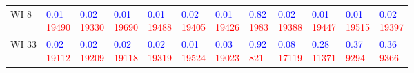 \begin{tabular}{llllllllllll}
WI 8   &  \makecell{\textcolor{blue}{0.01} \\ \textcolor{red}{19490}} &  \makecell{\textcolor{blue}{0.02} \\ \textcolor{red}{19330}} &  \makecell{\textcolor{blue}{0.01} \\ \textcolor{red}{19690}} &  \makecell{\textcolor{blue}{0.01} \\ \textcolor{red}{19488}} &  \makecell{\textcolor{blue}{0.02} \\ \textcolor{red}{19405}} &  \makecell{\textcolor{blue}{0.01} \\ \textcolor{red}{19426}} &  \makecell{\textcolor{blue}{0.82} \\ \textcolor{red}{1983}} &  \makecell{\textcolor{blue}{0.02} \\ \textcolor{red}{19388}} &  \makecell{\textcolor{blue}{0.01} \\ \textcolor{red}{19447}} &  \makecell{\textcolor{blue}{0.01} \\ \textcolor{red}{19515}} &  \makecell{\textcolor{blue}{0.02} \\ \textcolor{red}{19397}} \\
WI 33  &  \makecell{\textcolor{blue}{0.02} \\ \textcolor{red}{19112}} &  \makecell{\textcolor{blue}{0.02} \\ \textcolor{red}{19209}} &  \makecell{\textcolor{blue}{0.02} \\ \textcolor{red}{19118}} &  \makecell{\textcolor{blue}{0.02} \\ \textcolor{red}{19319}} &  \makecell{\textcolor{blue}{0.01} \\ \textcolor{red}{19524}} &  \makecell{\textcolor{blue}{0.03} \\ \textcolor{red}{19023}} &   \makecell{\textcolor{blue}{0.92} \\ \textcolor{red}{821}} &  \makecell{\textcolor{blue}{0.08} \\ \textcolor{red}{17119}} &  \makecell{\textcolor{blue}{0.28} \\ \textcolor{red}{11371}} &   \makecell{\textcolor{blue}{0.37} \\ \textcolor{red}{9294}} &   \makecell{\textcolor{blue}{0.36} \\ \textcolor{red}{9366}} \\

\end{tabular}
